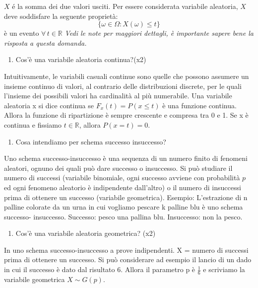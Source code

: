 $X$ é la somma dei due valori usciti.\newline
Per essere considerata variabile aleatoria, $X$ deve soddisfare la seguente proprietà:
\[ \{\omega \in \Omega : X(\omega) \le t\}\] è un evento $\forall\,t \in \mathbb{R}$\newline
\textit{Vedi le note per maggiori dettagli, è importante sapere bene la risposta a questa domanda.}
\begin{enumerate}[resume]\bfseries
\item Cos'è una variabile aleatoria continua?(x2)
\end{enumerate}
Intuitivamente, le variabili casuali continue sono quelle che possono assumere un insieme continuo di valori, al contrario delle distribuzioni discrete, per le quali l'insieme dei possibili valori ha cardinalità al più numerabile.\newline
Una variabile aleatoria x si dice continua se $F_x(t) = P(x \le t)$ è una funzione continua. Allora la funzione di ripartizione è sempre crescente e compresa tra 0 e 1.\newline
Se x è continua e fissiamo $t \in \mathbb{R}$, allora $P(x=t) = 0$.\newline
\begin{enumerate}[resume]\bfseries
\item Cosa intendiamo per schema successo insuccesso?
\end{enumerate}
Uno schema successo-insuccesso è una sequenza di un numero finito di fenomeni aleatori, ognuno dei quali può dare successo o insuccesso. Si può studiare il numero di successi (variabile binomiale, ogni successo avviene con probabilità $p$ ed ogni fenomeno aleatorio è indipendente dall'altro) o il numero di insuccessi prima di ottenere un successo (variabile geometrica).\newline
Esempio: L'estrazione di n palline colorate da un urna in cui vogliamo pescare k palline blu è uno schema successo- insuccesso. Successo: pesco una pallina blu. Insuccesso: non la pesco.
\begin{enumerate}[resume]\bfseries
\item Cos'è una variabile aleatoria geometrica? (x2)
\end{enumerate}
In uno schema successo-insuccesso a prove indipendenti.\newline
X = numero di successi prima di ottenere un successo.\newline
Si può considerare ad esempio il lancio di un dado in cui il successo è dato dal risultato 6. Allora il parametro p è $\frac{1}{6}$ e scriviamo la variabile geometrica $X \sim G(p)$.
